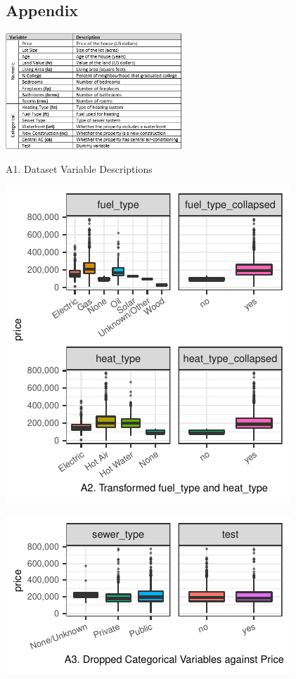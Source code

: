 \documentclass[letterpaper,9pt,twocolumn,twoside,]{pinp}
\begin{document}
\hypertarget{appendix}{%
\subsection{Appendix}\label{appendix}}

\begin{center}\includegraphics[width=250px]{Rdata_Files/variabletable} \end{center}
\centerline{\small A1. Dataset Variable Descriptions}

\begin{center}\includegraphics{Report_files/figure-latex/unnamed-chunk-20-1} \end{center}
\vspace{-20pt}

\begin{center}\includegraphics{Report_files/figure-latex/unnamed-chunk-21-1} \end{center}
\vspace{-20pt}
\end{document}
